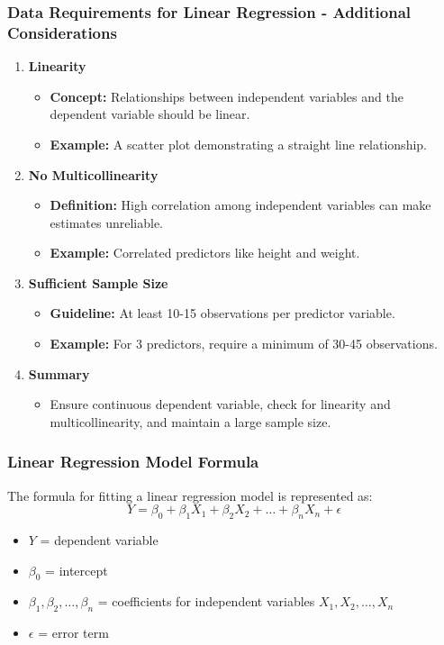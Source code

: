 \documentclass[aspectratio=169]{beamer}
\begin{document}
\begin{frame}[fragile]
    \frametitle{Data Requirements for Linear Regression - Additional Considerations}
    \begin{enumerate}[resume]
        \item \textbf{Linearity}
        \begin{itemize}
            \item \textbf{Concept:} Relationships between independent variables and the dependent variable should be linear.
            \item \textbf{Example:} A scatter plot demonstrating a straight line relationship.
        \end{itemize}
        
        \item \textbf{No Multicollinearity}
        \begin{itemize}
            \item \textbf{Definition:} High correlation among independent variables can make estimates unreliable.
            \item \textbf{Example:} Correlated predictors like height and weight.
        \end{itemize}

        \item \textbf{Sufficient Sample Size}
        \begin{itemize}
            \item \textbf{Guideline:} At least 10-15 observations per predictor variable.
            \item \textbf{Example:} For 3 predictors, require a minimum of 30-45 observations.
        \end{itemize}

        \item \textbf{Summary}
        \begin{itemize}
            \item Ensure continuous dependent variable, check for linearity and multicollinearity, and maintain a large sample size.
        \end{itemize}
    \end{enumerate}
\end{frame}

\begin{frame}[fragile]
    \frametitle{Linear Regression Model Formula}
    The formula for fitting a linear regression model is represented as:
    \begin{equation}
        Y = \beta_0 + \beta_1 X_1 + \beta_2 X_2 + \ldots + \beta_n X_n + \epsilon
    \end{equation}
    \begin{itemize}
        \item \(Y\) = dependent variable
        \item \(\beta_0\) = intercept
        \item \(\beta_1, \beta_2, \ldots, \beta_n\) = coefficients for independent variables \(X_1, X_2, \ldots, X_n\)
        \item \(\epsilon\) = error term
    \end{itemize}
\end{frame}
\end{document}
